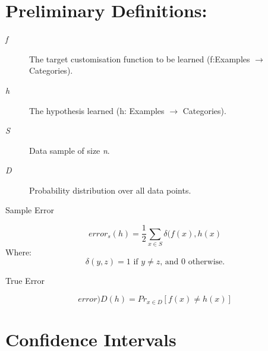 \documentclass[11pt]{article}
\begin{document}
\section{Preliminary Definitions:}
\label{sec:org1de180a}
\begin{description}
\item[{\emph{f}}] The target customisation function to be learned (f:Examples \(\rightarrow\) Categories).
\item[{\emph{h}}] The hypothesis learned (h: Examples \(\rightarrow\) Categories).
\item[{\emph{S}}] Data sample of size \emph{n}.
\item[{\emph{D}}] Probability distribution over all data points.
\item[{Sample Error}] 
\end{description}
\begin{equation}
error_s(h) = \frac{1}{2}\sum\limits_{x\in S} \delta(f(x),h(x)
\end{equation}
Where:
\begin{equation}
\delta(y,z) = \text{1 if }y\neq z\text{, and 0 otherwise.}
\end{equation}
\begin{description}
\item[{True Error}] 
\end{description}
\begin{equation}
error)D(h) = Pr_{x \in D}[f(x)\neq h(x)]
\end{equation}

\section{Confidence Intervals}
\label{sec:org79a8da5}
\end{document}

